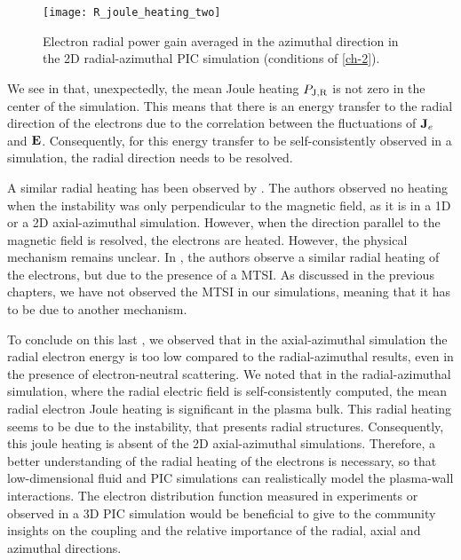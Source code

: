   \begin{figure}[hbt]
    \centering
    \texttt{[image: R\_joule\_heating\_two]}
    \caption{Electron radial power gain averaged in the azimuthal direction in the \acs{2D} radial-azimuthal \acs{PIC} simulation (conditions of \cref{ch-2}).}
    \label{fig-epower_radial}
  \end{figure}

  We see in  that, unexpectedly,  the mean Joule heating ${P_{\rm J, R}}$ is not zero in the center of the simulation.
  This means that there is an energy transfer to the radial direction of the electrons due to the correlation between the fluctuations of ${\mathbf J_e}$ and ${\mathbf E}$.
  Consequently, for this energy transfer to be self-consistently observed in a simulation, the radial direction needs to be resolved.

  A similar radial heating has been observed by \citet{heron2013}.
  The authors observed no heating when the instability was only perpendicular to the magnetic field, as it is in a \ac{1D} or a \ac{2D} axial-azimuthal simulation.
  However, when the direction parallel to the magnetic field is resolved, the electrons are heated.
  However, the physical mechanism remains unclear.
  In \citet{janhunen}, the authors observe a similar radial heating of the electrons, but due to the presence of a \ac{MTSI}.
  As discussed in the previous chapters, we have not observed the \ac{MTSI} in our simulations, meaning that it has to be due to another mechanism.

  \vspace{1em}
  To conclude  on this last , we observed that in the axial-azimuthal simulation the radial electron energy is too low compared to the radial-azimuthal results, even in the presence of electron-neutral scattering.
  We noted that in the radial-azimuthal simulation, where the radial electric field is self-consistently computed, the mean radial electron Joule heating is significant in the plasma bulk.
  This radial heating seems to be due to the instability, that presents radial structures.
  Consequently, this joule heating is absent of the \ac{2D} axial-azimuthal simulations.
  Therefore, a better understanding of the radial heating of the electrons is necessary, so that low-dimensional fluid and \ac{PIC} simulations can realistically model the plasma-wall interactions.
  The electron distribution function measured in experiments or observed in a \ac{3D} \ac{PIC} simulation would be beneficial to give to the community insights on the coupling and the relative importance of the radial, axial and azimuthal directions.




